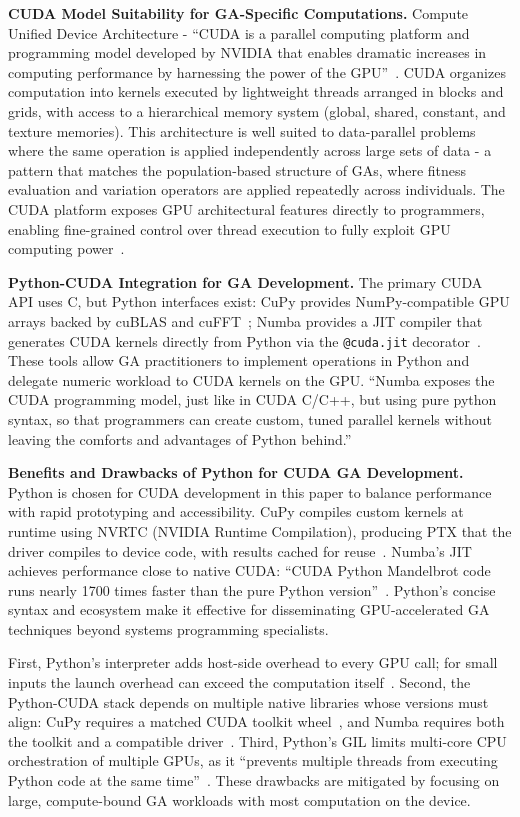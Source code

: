 \documentclass[a4paper,14pt]{extarticle}
\begin{document}

\textbf{CUDA Model Suitability for GA-Specific Computations.} Compute Unified Device Architecture - ``CUDA is a parallel computing platform and programming model developed by NVIDIA that enables dramatic increases in computing performance by harnessing the power of the GPU''~\cite{nvidia2023cuda}. CUDA organizes computation into kernels executed by lightweight threads arranged in blocks and grids, with access to a hierarchical memory system (global, shared, constant, and texture memories). This architecture is well suited to data-parallel problems where the same operation is applied independently across large sets of data - a pattern that matches the population-based structure of GAs, where fitness evaluation and variation operators are applied repeatedly across individuals. The CUDA platform exposes GPU architectural features directly to programmers, enabling fine-grained control over thread execution to fully exploit GPU computing power~\cite{cheng2020parallel}.

\textbf{Python-CUDA Integration for GA Development.} The primary CUDA API uses C, but Python interfaces exist: CuPy provides NumPy-compatible GPU arrays backed by cuBLAS and cuFFT~\cite{cupy_docs}; Numba provides a JIT compiler that generates CUDA kernels directly from Python via the \texttt{@cuda.jit} decorator~\cite{numba_cuda}. These tools allow GA practitioners to implement operations in Python and delegate numeric workload to CUDA kernels on the GPU. ``Numba exposes the CUDA programming model, just like in CUDA C/C++, but using pure python syntax, so that programmers can create custom, tuned parallel kernels without leaving the comforts and advantages of Python behind.''\cite{harris2017numba}

\textbf{Benefits and Drawbacks of Python for CUDA GA Development.} Python is chosen for CUDA development in this paper to balance performance with rapid prototyping and accessibility. CuPy compiles custom kernels at runtime using NVRTC (NVIDIA Runtime Compilation), producing PTX that the driver compiles to device code, with results cached for reuse~\cite{cupy_docs}. Numba's JIT achieves performance close to native CUDA: ``CUDA Python Mandelbrot code runs nearly 1700 times faster than the pure Python version''~\cite{harris2017numba}. Python's concise syntax and ecosystem make it effective for disseminating GPU-accelerated GA techniques beyond systems programming specialists.

First, Python's interpreter adds host-side overhead to every GPU call; for small inputs the launch overhead can exceed the computation itself~\cite{carpentries_gpu}. Second, the Python-CUDA stack depends on multiple native libraries whose versions must align: CuPy requires a matched CUDA toolkit wheel~\cite{cupy_install}, and Numba requires both the toolkit and a compatible driver~\cite{numba_cuda}. Third, Python's GIL limits multi-core CPU orchestration of multiple GPUs, as it ``prevents multiple threads from executing Python code at the same time''~\cite{pep703}. These drawbacks are mitigated by focusing on large, compute-bound GA workloads with most computation on the device.
\end{document}
